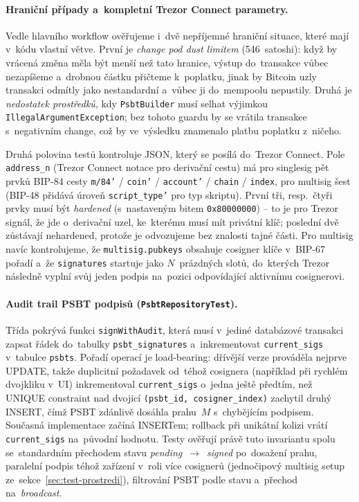 \paragraph{Hraniční případy a~kompletní Trezor Connect parametry.}
Vedle hlavního workflow ověřujeme i~dvě nepříjemné hraniční situace,
které mají v~kódu vlastní větve. První je \emph{change pod dust
limitem} (546~satoshi): když by vrácená změna měla být menší než tato
hranice, výstup do~transakce vůbec nezapíšeme a~drobnou částku přičteme
k~poplatku, jinak by Bitcoin uzly transakci odmítly jako nestandardní
a~vůbec ji do~mempoolu nepustily. Druhá je \emph{nedostatek prostředků},
kdy \texttt{PsbtBuilder} musí selhat výjimkou
\texttt{IllegalArgumentException}; bez tohoto guardu by se vrátila
transakce s~negativním change, což by ve~výsledku znamenalo platbu
poplatku z~ničeho.

Druhá polovina testů kontroluje JSON, který se posílá do~Trezor
Connect. Pole \texttt{address\_n} (Trezor Connect notace pro derivační
cestu) má pro singlesig pět prvků BIP-84 cesty
\texttt{m/84'} / \texttt{coin'} / \texttt{account'} / \texttt{chain}
/ \texttt{index}, pro multisig šest (BIP-48 přidává úroveň
\texttt{script\_type'} pro typ skriptu). První tři, resp.~čtyři prvky
musí být \emph{hardened} (s~nastaveným bitem \texttt{0x80000000}) --
to je pro Trezor signál, že jde o~derivační uzel, ke~kterému musí
mít privátní klíč; poslední dvě zůstávají nehardened, protože je
odvozujeme bez znalosti tajné části.
Pro multisig navíc kontrolujeme, že
\texttt{multisig.\allowbreak pubkeys} obsahuje cosigner klíče v~BIP-67
pořadí a~že \texttt{signatures} startuje jako $N$~prázdných slotů, do~kterých
Trezor následně vyplní svůj jeden podpis na~pozici odpovídající
aktivnímu cosignerovi.

\paragraph{Audit trail PSBT podpisů (\texttt{PsbtRepositoryTest}).}
Třída pokrývá funkci \texttt{signWithAudit}, která musí v~jediné
databázové transakci zapsat řádek do~tabulky
\texttt{psbt\allowbreak \_\allowbreak signatures} a~inkrementovat
\texttt{current\allowbreak \_\allowbreak sigs} v~tabulce \texttt{psbts}.
Pořadí operací je load-bearing: dřívější verze prováděla nejprve
UPDATE, takže duplicitní požadavek od~téhož cosignera (například
při rychlém dvojkliku v~UI) inkrementoval
\texttt{current\allowbreak \_\allowbreak sigs} o~jedna ještě předtím,
než UNIQUE constraint nad dvojicí
\texttt{(psbt\_id, cosigner\allowbreak \_\allowbreak index)}
zachytil druhý INSERT, čímž PSBT zdánlivě dosáhla prahu~$M$
s~chybějícím podpisem. Současná implementace začíná INSERTem;
rollback při unikátní kolizi vrátí
\texttt{current\allowbreak \_\allowbreak sigs} na~původní hodnotu.
Testy ověřují právě tuto invariantu spolu se~standardním přechodem
stavu \emph{pending}~$\to$~\emph{signed} po~dosažení prahu, paralelní
podpis téhož zařízení v~roli více cosignerů (jednočipový multisig
setup ze~sekce~\ref{sec:test-prostredi}), filtrování PSBT podle stavu
a~přechod na~\emph{broadcast}.

